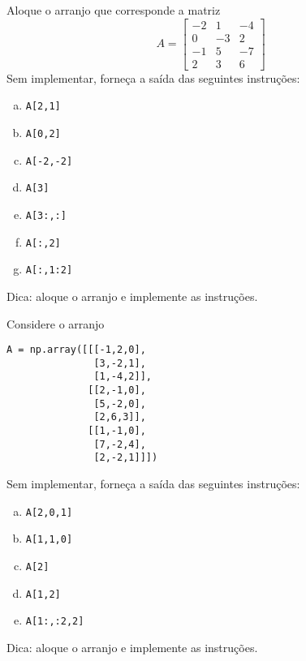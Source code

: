 \begin{exer}
  Aloque o arranjo que corresponde a matriz
  \begin{equation}
    A =
    \begin{bmatrix}
      -2 & 1 & -4\\
      0  & -3 & 2\\
      -1 & 5 & -7\\
      2 & 3 & 6
    \end{bmatrix}
  \end{equation}
  Sem implementar, forneça a saída das seguintes instruções:
  \begin{enumerate}[a)]
  \item \lstinline+A[2,1]+
  \item \lstinline+A[0,2]+
  \item \lstinline+A[-2,-2]+
  \item \lstinline+A[3]+
  \item \lstinline+A[3:,:]+
  \item \lstinline+A[:,2]+
  \item \lstinline+A[:,1:2]+
  \end{enumerate}
\end{exer}
\begin{resp}
  Dica: aloque o arranjo e implemente as instruções.
\end{resp}

\begin{exer}
  Considere o arranjo

\begin{lstlisting}
A = np.array([[[-1,2,0],
               [3,-2,1],
               [1,-4,2]],
              [[2,-1,0],
               [5,-2,0],
               [2,6,3]],
              [[1,-1,0],
               [7,-2,4],
               [2,-2,1]]])
\end{lstlisting}

Sem implementar, forneça a saída das seguintes instruções:
  \begin{enumerate}[a)]
  \item \lstinline+A[2,0,1]+
  \item \lstinline+A[1,1,0]+
  \item \lstinline+A[2]+
  \item \lstinline+A[1,2]+
  \item \lstinline+A[1:,:2,2]+
  \end{enumerate}
\end{exer}
\begin{resp}
  Dica: aloque o arranjo e implemente as instruções.
\end{resp}

